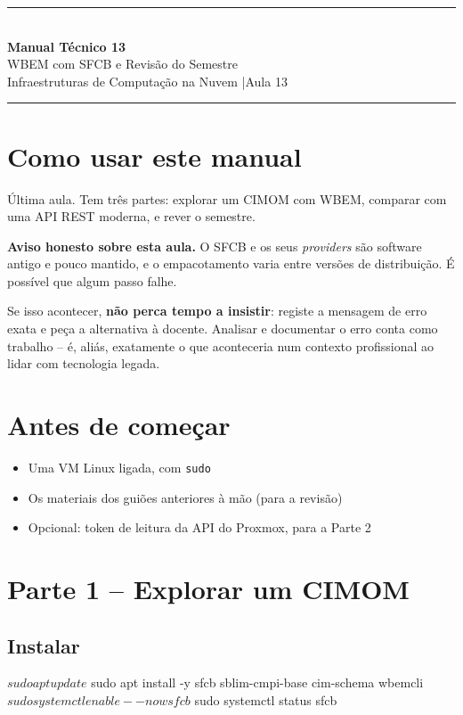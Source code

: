 \documentclass[11pt,a4paper]{article}
\newcommand{\manualtitle}[3]{%
  \thispagestyle{empty}
  \begin{center}
  {\color{NudeTaupe}\rule{\textwidth}{0.5pt}}\\[0.5cm]
  {\LARGE\bfseries\color{TextEspresso} Manual Técnico #1}\\[0.35cm]
  {\large\color{TextEspresso} #2}\\[0.3cm]
  {\normalsize\color{NudeTaupe} Infraestruturas de Computação na Nuvem \quad|\quad #3}\\[0.4cm]
  {\color{NudeTaupe}\rule{\textwidth}{0.5pt}}
  \end{center}
  \vspace{0.4cm}
}
\begin{document}
\manualtitle{13}{WBEM com SFCB e Revisão do Semestre}{Aula 13}

\section*{Como usar este manual}

Última aula. Tem três partes: explorar um CIMOM com WBEM, comparar com uma API REST moderna, e rever o semestre.

\begin{atencao}
\textbf{Aviso honesto sobre esta aula.} O SFCB e os seus \emph{providers} são software antigo e pouco mantido, e o empacotamento varia entre versões de distribuição. É possível que algum passo falhe.

Se isso acontecer, \textbf{não perca tempo a insistir}: registe a mensagem de erro exata e peça a alternativa à docente. Analisar e documentar o erro conta como trabalho -- é, aliás, exatamente o que aconteceria num contexto profissional ao lidar com tecnologia legada.
\end{atencao}

\section*{Antes de começar}

\begin{itemize}
  \item[$\square$] Uma VM Linux ligada, com \texttt{sudo}
  \item[$\square$] Os materiais dos guiões anteriores à mão (para a revisão)
  \item[$\square$] Opcional: token de leitura da API do Proxmox, para a Parte 2
\end{itemize}

\section{Parte 1 -- Explorar um CIMOM}

\subsection{Instalar}

\begin{terminal}
$ sudo apt update
$ sudo apt install -y sfcb sblim-cmpi-base cim-schema wbemcli
$ sudo systemctl enable --now sfcb
$ sudo systemctl status sfcb
\end{terminal}
\end{document}
